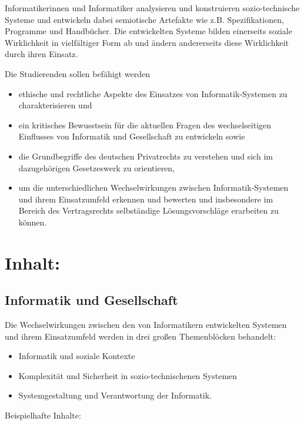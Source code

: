 Informatikerinnen und Informatiker analysieren und konstruieren
sozio-technische Systeme und entwickeln dabei semiotische Artefakte wie
z.B. Spezifikationen, Programme und Handbücher. Die entwickelten Systeme
bilden einerseits soziale Wirklichkeit in vielfältiger Form ab und
ändern andererseits diese Wirklichkeit durch ihren Einsatz.

Die Studierenden sollen befähigt werden

\begin{itemize}
\tightlist
\item
  ethische und rechtliche Aspekte des Einsatzes von Informatik-Systemen
  zu charakterisieren und
\item
  ein kritisches Bewusstsein für die aktuellen Fragen des
  wechselseitigen Einflusses von Informatik und Gesellschaft zu
  entwickeln sowie
\item
  die Grundbegriffe des deutschen Privatrechts zu verstehen und sich im
  dazugehörigen Gesetzeswerk zu orientieren,
\item
  um die unterschiedlichen Wechselwirkungen zwischen Informatik-Systemen
  und ihrem Einsatzumfeld erkennen und bewerten und insbesondere im
  Bereich des Vertragsrechts selbständige Lösungsvorschläge erarbeiten
  zu können.
\end{itemize}

\section*{Inhalt:}\label{inhalt-16}

\subsection*{Informatik und
Gesellschaft}\label{informatik-und-gesellschaft}

Die Wechselwirkungen zwischen den von Informatikern entwickelten
Systemen und ihrem Einsatzumfeld werden in drei großen Themenblöcken
behandelt:

\begin{itemize}
\tightlist
\item
  Informatik und soziale Kontexte
\item
  Komplexität und Sicherheit in sozio-technischenen Systemen
\item
  Systemgestaltung und Verantwortung der Informatik.
\end{itemize}

Beispielhafte Inhalte:

